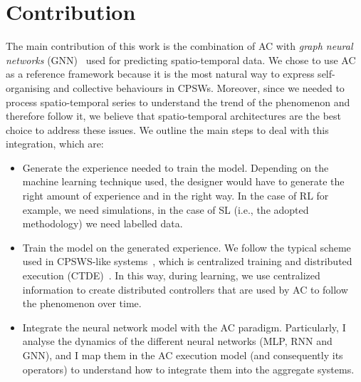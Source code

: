 \documentclass{article}
\begin{document}
\section{Contribution}
The main contribution of this work is the combination of AC with \textit{graph neural networks} (GNN)~\cite{wu2020comprehensive} used for predicting spatio-temporal data. 
We chose to use AC as a reference framework because it is the most natural way to express self-organising and collective behaviours in CPSWs. 
Moreover, since we needed to process spatio-temporal series to understand the trend of the phenomenon and therefore follow it, we believe that spatio-temporal architectures are the best choice to address these issues.
We outline the main steps to deal with this integration, which are:
 \begin{itemize}
\item Generate the experience needed to train the model. 
 Depending on the machine learning technique used, 
 the designer would have to generate the right amount of experience and in the right way. In the case of RL for example, we need simulations, in the case of SL (i.e., the adopted methodology) we need labelled data.
\item Train the model on the generated experience. We follow the typical scheme used in CPSWS-like systems~\cite{aguzzi2021research, DBLP:conf/icdcs/AguzziCV22}, which is centralized training and distributed execution (CTDE)~\cite{foerster2016learning}. 
In this way, during learning, we use centralized information to create distributed controllers that are used by AC to 
follow the phenomenon over time.
\item Integrate the neural network model with the AC paradigm. Particularly, I analyse the dynamics of the different neural networks (MLP, RNN and GNN), and I map them in the AC execution model (and consequently its operators) to understand how to integrate them into the aggregate systems.
\end{itemize}
\end{document}
